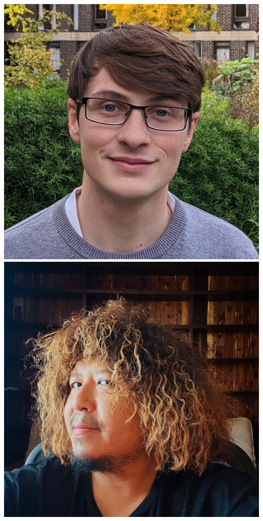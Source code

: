\documentclass[aspectratio=169]{beamer}
\begin{document}
\begin{frame}
{            \includegraphics[width=0.09\textheight]{figures/students/thomas_gessey-jones.jpg}%
            \includegraphics[width=0.09\textheight]{figures/students/tze_goh.jpg}%
}
\end{frame}
\end{document}
